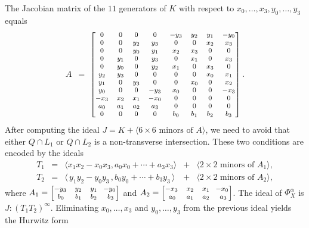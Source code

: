 \documentclass[12pt]{article}
\theoremstyle{definition}
\newenvironment{example}
{\pushQED{\qed}\renewcommand{\qedsymbol}{$\diamond$}\examplex}
{\popQED\endexamplex}
\begin{document}
\begin{example}
The Jacobian matrix of the $11$ generators of $K$ with respect to $x_0,\ldots,x_3,y_0,\ldots,y_3$ equals
\[
    A \,\,\,=\,\, \begin{footnotesize}
    \begin{bmatrix}
      0&0&0&0&-y_{3}&y_{2}&y_{1}&-y_{0}\\
      0&0&y_{2}&y_{3}&0&0&x_{2}&x_{3}\\
      0&0&y_{0}&y_{1}&x_{2}&x_{3}&0&0\\
      0&y_{1}&0&y_{3}&0&x_{1}&0&x_{3}\\
      0&y_{0}&0&y_{2}&x_{1}&0&x_{3}&0\\
      y_{2}&y_{3}&0&0&0&0&x_{0}&x_{1}\\
      y_{1}&0&y_{3}&0&0&x_{0}&0&x_{2}\\
      y_{0}&0&0&-y_{3}&x_{0}&0&0&-x_{3}\\
      -x_{3}&x_{2}&x_{1}&-x_{0}&0&0&0&0\\
      a_{0}&a_{1}&a_{2}&a_{3}&0&0&0&0\\
      0&0&0&0&b_{0}&b_{1}&b_{2}&b_{3}
    \end{bmatrix}. \end{footnotesize}
\]
After computing the ideal $J=K+\langle\text{$6\times 6$ minors of $A$}\rangle$, we need to avoid  that either $Q\cap L_1$ or $Q\cap L_2$ is a non-transverse intersection. These two conditions are encoded by the ideals
$$
\begin{matrix}
    T_1 &=& \langle x_{1}x_{2}-x_{0}x_{3},a_0x_0+\cdots+a_3x_3\rangle &+& \langle\text{$2\times 2$ minors of $A_1$}\rangle,\\
    T_2 &=& \langle \,y_{1}y_{2}-y_{0}y_{3}\,,b_0y_0+\cdots+b_3y_3\,\rangle &+& \langle\text{$2\times 2$ minors of $A_2$}\rangle,
\end{matrix}
$$
where
$
A_1 =
\begin{footnotesize}
\begin{bmatrix}
    -y_3 & y_2 & y_1 & \!\!-y_0\\
    \,b_0 & b_1 & b_2 & b_3
\end{bmatrix}\end{footnotesize} $ and $
A_2 = \begin{footnotesize}
\begin{bmatrix}
    -x_3 & x_2 & x_1 & \!\!-x_0\\
    \,a_0 & a_1 & a_2 & a_3
\end{bmatrix} \end{footnotesize}$.
The ideal of $\Phi^\alpha_X$ is $J\colon(T_1T_2)^\infty$. 
Eliminating $x_0,\ldots,x_3$ and $y_0,\ldots,y_3$ from the previous ideal yields the Hurwitz form

\end{example}
\end{document}

